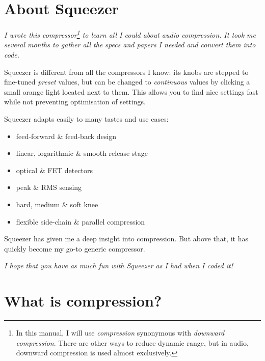 \maketitle

\tableofcontents

\clearpage  %

\chapter{About Squeezer}
\label{chap:about_squeezer}

\emph{I wrote this compressor\footnote{In this manual, I will use
    \emph{compression} synonymous with \emph{downward compression}.
    There are other ways to reduce dynamic range, but in audio,
    downward compression is used almost exclusively.} to learn all I
  could about audio compression.  It took me several months to gather
  all the specs and papers I needed and convert them into code.}

Squeezer is different from all the compressors I know: its knobs are
stepped to fine-tuned \emph{preset} values, but can be changed to
\emph{continuous} values by clicking a small orange light located next
to them.  This allows you to find nice settings fast while not
preventing optimisation of settings.

Squeezer adapts easily to many tastes and use cases:

\begin{itemize}
\item feed-forward \& feed-back design
\item linear, logarithmic \& smooth release stage
\item optical \& FET detectors
\item peak \& RMS sensing
\item hard, medium \& soft knee
\item flexible side-chain \& parallel compression
\end{itemize}

Squeezer has given me a deep insight into compression.  But above
that, it has quickly become my go-to generic compressor.

\emph{I hope that you have as much fun with Squeezer as I had when I
  coded it!}

\chapter{What is compression?}
\label{chap:what_is_compression}

